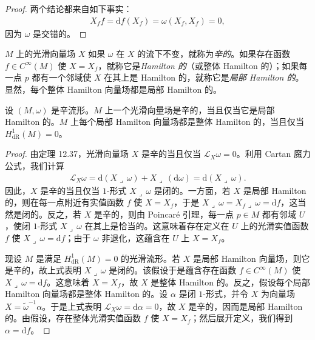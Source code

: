 \documentclass[../../main.tex]{subfiles}
\begin{document}
\begin{proof}
两个结论都来自如下事实：
\begin{align*}
X_f f=\mathrm{d}f(X_f)=\omega(X_f,X_f)=0,
\end{align*}
因为 $\omega$ 是交错的。
\end{proof}

$M$ 上的光滑向量场 $X$ 如果 $\omega$ 在 $X$ 的流下不变，就称为\emph{辛的}。如果存在函数 $f\in C^\infty(M)$ 使 $X=X_f$，就称它是\emph{Hamilton 的}（或整体 Hamilton 的）；如果每一点 $p$ 都有一个邻域使 $X$ 在其上是 Hamilton 的，就称它是\emph{局部 Hamilton 的}。显然，每个整体 Hamilton 向量场都是局部 Hamilton 的。

\begin{proposition}\label{proposition:ch22-hamiltonian-symplectic}
设 $(M,\omega)$ 是辛流形。$M$ 上一个光滑向量场是辛的，当且仅当它是局部 Hamilton 的。$M$ 上每个局部 Hamilton 向量场都是整体 Hamilton 的，当且仅当 $H^1_{\mathrm{dR}}(M)=0$。
\end{proposition}

\begin{proof}
由定理 12.37，光滑向量场 $X$ 是辛的当且仅当 $\mathcal L_X\omega=0$。利用 Cartan 魔力公式，我们计算
\begin{align}
\mathcal L_X\omega=\mathrm{d}(X\lrcorner\,\omega)+X\lrcorner\,(\mathrm{d}\omega)=\mathrm{d}(X\lrcorner\,\omega).
\end{align}
因此，$X$ 是辛的当且仅当 $1$-形式 $X\lrcorner\,\omega$ 是闭的。一方面，若 $X$ 是局部 Hamilton 的，则在每一点附近有实值函数 $f$ 使 $X=X_f$，于是 $X\lrcorner\,\omega=X_f\lrcorner\,\omega=\mathrm{d}f$，这当然是闭的。反之，若 $X$ 是辛的，则由 Poincar\'e 引理，每一点 $p\in M$ 都有邻域 $U$，使闭 $1$-形式 $X\lrcorner\,\omega$ 在其上是恰当的。这意味着存在定义在 $U$ 上的光滑实值函数 $f$ 使 $X\lrcorner\,\omega=\mathrm{d}f$；由于 $\omega$ 非退化，这蕴含在 $U$ 上 $X=X_f$。

现设 $M$ 是满足 $H^1_{\mathrm{dR}}(M)=0$ 的光滑流形。若 $X$ 是局部 Hamilton 向量场，则它是辛的，故上式表明 $X\lrcorner\,\omega$ 是闭的。该假设于是蕴含存在函数 $f\in C^\infty(M)$ 使 $X\lrcorner\,\omega=\mathrm{d}f$。这意味着 $X=X_f$，故 $X$ 是整体 Hamilton 的。反之，假设每个局部 Hamilton 向量场都是整体 Hamilton 的。设 $\alpha$ 是闭 $1$-形式，并令 $X$ 为向量场 $X=\widetilde\omega^{-1}\alpha$。于是上式表明 $\mathcal L_X\omega=\mathrm{d}\alpha=0$，故 $X$ 是辛的，因而是局部 Hamilton 的。由假设，存在整体光滑实值函数 $f$ 使 $X=X_f$；然后展开定义，我们得到 $\alpha=\mathrm{d}f$。
\end{proof}
\end{document}
